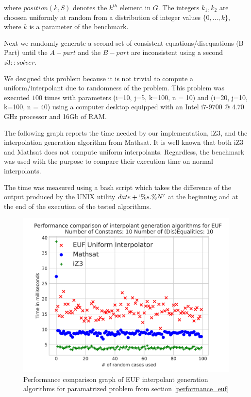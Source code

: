 where $position(k, S)$ denotes the $k^{th}$ element in $G$. The 
integers $k_1, k_2$ are choosen uniformly at random from a
distribution of integer values $\{0, \dots, k\}$, 
where $k$ is a parameter of the benchmark.

Next we randomly generate a second set of consistent 
equations/disequations (B-Part) until the $A-part$ and the
$B-part$ are inconsistent using a second $z3: :solver$.

We designed this problem because it is not trivial to 
compute a  uniform/interpolant due to randomness of the
problem. This problem was executed $100$ times
with parameters (i=10, j=5, k=100, n = 10) and 
(i=20, j=10, k=100, n = 40)
using a computer desktop
equipped with an Intel i7-9700 @ 4.70 GHz processor 
and 16Gb of RAM. 

The following graph reports the time needed
by our implementation, iZ3, and the interpolation 
generation algorithm from Mathsat. 
It is well known that both iZ3 and Mathsat does not
compute uniform interpolants. Regardless, the benchmark
was used with the purpose to compare their execution time
on normal interpolants.

The time was
measured using a bash script which takes the difference
of the output produced by the UNIX utility $date +`\%s.\%N'$ 
at the beginning and at the end of the execution of the 
tested algorithms.

\begin{figure}
  \centering
  \includegraphics[scale=0.9]{figures/eufi_performance_graph_10_5_3_10_100}
  \caption{Performance comparison graph of EUF interpolant generation
  algorithms for paramatrized problem from section \ref{performance_euf}} 
  \label{performance_graph_euf}
\end{figure}

